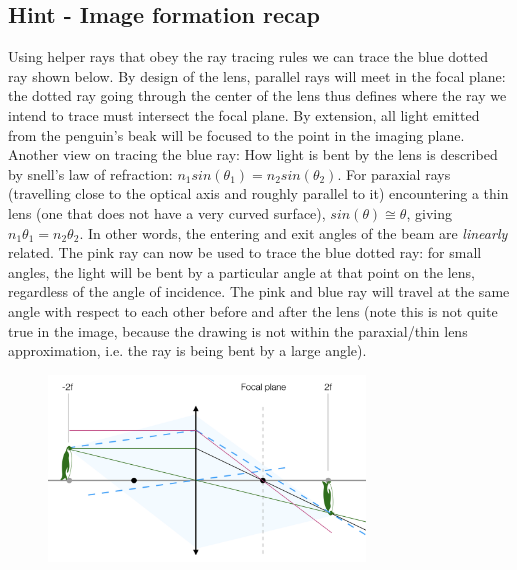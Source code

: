 \documentclass[a4paper]{report}
\begin{document}
    \subsection{Hint - Image formation recap}
	\hypertarget{hintTo-recap}{}
	Using helper rays that obey the ray tracing rules we can trace the blue dotted ray shown below. By design of the lens, parallel rays will meet in the focal plane: the dotted ray going through the center of the lens thus defines where the ray we intend to trace must intersect the focal plane. By extension, all light emitted from the penguin's beak will be focused to the point in the imaging plane.
	\\
	
	Another view on tracing the blue ray: How light is bent by the lens is described by snell's law of refraction: $n_1 sin(\theta_1) = n_2 sin(\theta_2)$. For paraxial rays (travelling close to the optical axis and roughly parallel to it) encountering a thin lens (one that does not have a very curved surface), $sin(\theta)\cong\theta$, giving $n_1 \theta_1 = n_2 \theta_2$. In other words, the entering and exit angles of the beam are \emph{linearly} related. The pink ray can now be used to trace the blue dotted ray: for small angles, the light will be bent by a particular angle at that point on the lens, regardless of the angle of incidence. The pink and blue ray will travel at the same angle with respect to each other before and after the lens (note this is not quite true in the image, because the drawing is not within the paraxial/thin lens approximation, i.e. the ray is being bent by a large angle).
	
	\begin{figure}[h]
		\center
		\includegraphics[width=0.75\textwidth]{hint_ray_tracing.png}
		\label{hint_ray_tracing}
	\end{figure}
\end{document}
